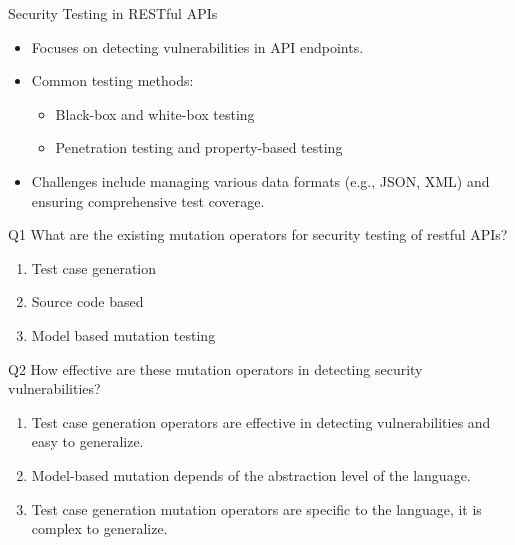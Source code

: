 \documentclass[12pt]{beamer}
\theoremstyle{remark}
\theoremstyle{definition}
\begin{document}
\begin{frame}[allowframebreaks]
\begin{block}{Security Testing in RESTful APIs}
\begin{itemize}
    \item Focuses on detecting vulnerabilities in API endpoints.
    \item Common testing methods:
    \begin{itemize}
        \item Black-box and white-box testing
        \item Penetration testing and property-based testing
    \end{itemize}
    \item Challenges include managing various data formats (e.g., JSON, XML) and ensuring comprehensive test coverage.
\end{itemize}
\end{block}
\pagebreak
\begin{block}{Q1}
     What are the existing mutation operators for security testing of restful APIs?
     \begin{enumerate}
      \item Test case generation
      \item Source code based
      \item Model based mutation testing
  \end{enumerate}
\end{block}
\pagebreak
\begin{block}{Q2}
    How effective are these mutation operators in detecting security vulnerabilities?
  \begin{enumerate}
    \item Test case generation operators are effective in detecting vulnerabilities and easy to generalize.
    \item Model-based mutation depends of the abstraction level of the language.
    \item Test case generation mutation operators are specific to the language, it is complex to generalize.
  \end{enumerate}
\end{block}

\end{frame}
\end{document}
